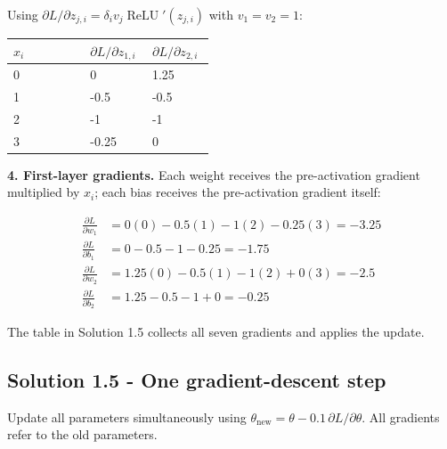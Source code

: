 \documentclass{course_sheet}
\begin{document}
Using
$\partial L/\partial z_{j,i}=\delta_i v_j\operatorname{ReLU}'(z_{j,i})$
with $v_1=v_2=1$:

\begin{center}

\begingroup
\setlength{\tabcolsep}{3pt}
\begin{tabular}{@{}p{0.362\linewidth}p{0.295\linewidth}p{0.295\linewidth}@{}}
\toprule
$x_i$ & $\partial L/\partial z_{1,i}$ & $\partial L/\partial z_{2,i}$ \\
\midrule
0 & 0 & 1.25 \\
1 & -0.5 & -0.5 \\
2 & -1 & -1 \\
3 & -0.25 & 0 \\
\bottomrule
\end{tabular}
\endgroup

\end{center}

\textbf{4. First-layer gradients.} Each weight receives the
pre-activation gradient multiplied by $x_i$; each bias receives the
pre-activation gradient itself:

\begin{equation*}
\begin{split}
\frac{\partial L}{\partial w_1}&=0(0)-0.5(1)-1(2)-0.25(3)=-3.25\\
\frac{\partial L}{\partial b_1}&=0-0.5-1-0.25=-1.75\\
\frac{\partial L}{\partial w_2}&=1.25(0)-0.5(1)-1(2)+0(3)=-2.5\\
\frac{\partial L}{\partial b_2}&=1.25-0.5-1+0=-0.25
\end{split}
\end{equation*}

The table in Solution 1.5 collects all seven gradients and applies the
update.

\subsection{Solution 1.5 - One gradient-descent step}

Update all parameters simultaneously using
$\theta_{\mathrm{new}}=\theta-0.1\,\partial L/\partial\theta$. All
gradients refer to the old parameters.
\end{document}
